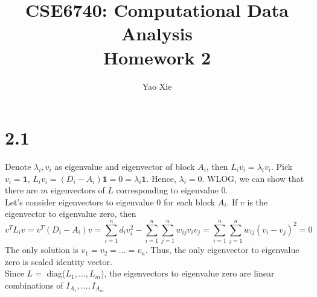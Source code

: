 \documentclass[12pt]{article}
\title{CSE6740: Computational Data Analysis \\ Homework 2}
\author{Yao Xie}
\begin{document}
\maketitle


\section*{2.1}
Denote $\lambda_i,v_i$ as eigenvalue and eigenvector of block $A_i$, then $L_iv_i = \lambda_iv_i$. Pick $v_i = \mathbf{1}$, $L_iv_i = (D_i-A_i)\mathbf{1} = 0 = \lambda_i \mathbf{1}$. Hence, $\lambda_i = 0$. WLOG, we can show that there are $m$ eigenvectors of $L$ corresponding to eigenvalue 0.\\
Let's consider eigenvectors to eigenvalue 0 for each block $A_i$. If $v$ is the eigenvector to eigenvalue zero, then
$$v^TL_iv = v^T(D_i-A_i)v = \sum_{i=1}^{n}d_iv_i^2 - \sum_{i=1}^{n}\sum_{j=1}^{n}w_{ij}v_iv_j = \sum_{i = 1}^{n}\sum_{j=1}^{n}w_{ij}(v_i-v_j)^2 = 0$$
The only solution is $v_1 = v_2 = ... = v_n$. Thus, the only eigenvector to eigenvalue zero is scaled identity vector.\\
Since $L = $ diag($L_1,...,L_m$), the eigenvectors to eigenvalue zero are linear combinations of $I_{A_1},...,I_{A_m}$
\end{document}
